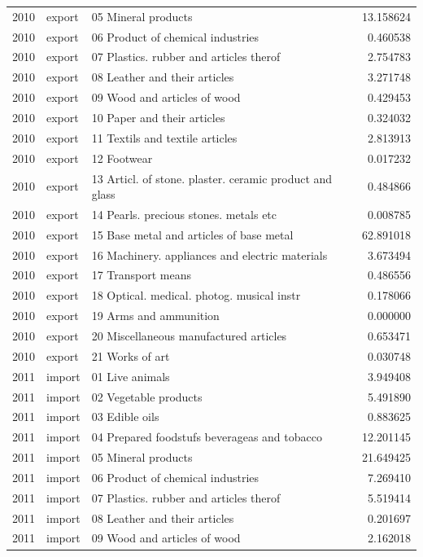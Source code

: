\begin{tabular}{rllr}
2010 & export & 05 Mineral products & 13.158624 \\
2010 & export & 06 Product of chemical industries & 0.460538 \\
2010 & export & 07 Plastics. rubber and articles therof & 2.754783 \\
2010 & export & 08 Leather and their articles & 3.271748 \\
2010 & export & 09 Wood and articles of wood & 0.429453 \\
2010 & export & 10 Paper and their articles & 0.324032 \\
2010 & export & 11 Textils and textile articles & 2.813913 \\
2010 & export & 12 Footwear & 0.017232 \\
2010 & export & 13 Articl. of stone. plaster. ceramic product and glass & 0.484866 \\
2010 & export & 14 Pearls. precious stones. metals etc & 0.008785 \\
2010 & export & 15 Base metal and articles of base metal & 62.891018 \\
2010 & export & 16 Machinery. appliances and electric materials & 3.673494 \\
2010 & export & 17 Transport means & 0.486556 \\
2010 & export & 18 Optical. medical. photog. musical instr & 0.178066 \\
2010 & export & 19 Arms and ammunition & 0.000000 \\
2010 & export & 20 Miscellaneous manufactured articles & 0.653471 \\
2010 & export & 21 Works of art & 0.030748 \\
2011 & import & 01 Live animals & 3.949408 \\
2011 & import & 02 Vegetable products & 5.491890 \\
2011 & import & 03 Edible oils & 0.883625 \\
2011 & import & 04 Prepared foodstufs beverageas and tobacco & 12.201145 \\
2011 & import & 05 Mineral products & 21.649425 \\
2011 & import & 06 Product of chemical industries & 7.269410 \\
2011 & import & 07 Plastics. rubber and articles therof & 5.519414 \\
2011 & import & 08 Leather and their articles & 0.201697 \\
2011 & import & 09 Wood and articles of wood & 2.162018 \\

\end{tabular}
